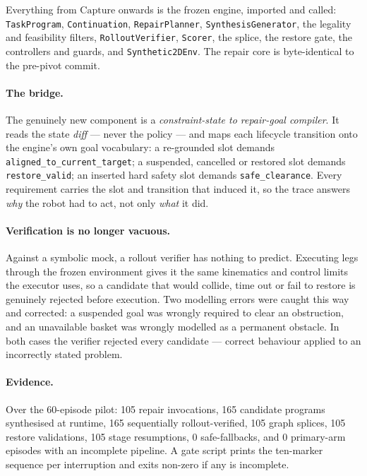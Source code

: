\documentclass[11pt]{article}
\begin{document}
Everything from $\mathrm{Capture}$ onwards is the frozen engine, imported and
called: \texttt{TaskProgram}, \texttt{Continuation}, \texttt{RepairPlanner},
\texttt{SynthesisGenerator}, the legality and feasibility filters,
\texttt{RolloutVerifier}, \texttt{Scorer}, the splice, the restore gate, the
controllers and guards, and \texttt{Synthetic2DEnv}. The repair core is
byte-identical to the pre-pivot commit.

\paragraph{The bridge.}
The genuinely new component is a \emph{constraint-state to repair-goal
compiler}. It reads the state \emph{diff} --- never the policy --- and maps each
lifecycle transition onto the engine's own goal vocabulary: a re-grounded slot
demands \texttt{aligned\_to\_current\_target}; a suspended, cancelled or
restored slot demands \texttt{restore\_valid}; an inserted hard safety slot
demands \texttt{safe\_clearance}. Every requirement carries the slot and
transition that induced it, so the trace answers \emph{why} the robot had to act,
not only \emph{what} it did.

\paragraph{Verification is no longer vacuous.}
Against a symbolic mock, a rollout verifier has nothing to predict. Executing
legs through the frozen environment gives it the same kinematics and control
limits the executor uses, so a candidate that would collide, time out or fail to
restore is genuinely rejected before execution. Two modelling errors were caught
this way and corrected: a suspended goal was wrongly required to clear an
obstruction, and an unavailable basket was wrongly modelled as a permanent
obstacle. In both cases the verifier rejected every candidate --- correct
behaviour applied to an incorrectly stated problem.

\paragraph{Evidence.} Over the 60-episode pilot: 105 repair invocations, 165
candidate programs synthesised at runtime, 165 sequentially rollout-verified,
105 graph splices, 105 restore validations, 105 stage resumptions, 0
safe-fallbacks, and 0 primary-arm episodes with an incomplete pipeline. A gate
script prints the ten-marker sequence per interruption and exits non-zero if any
is incomplete.
\end{document}
